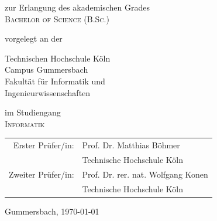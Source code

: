 \begin{titlepage}
\begin{center}
\vspace{1.2cm}

\begin{large}
zur Erlangung des akademischen Grades\\
\vspace{0.1cm}
\textsc{Bachelor of Science (B.Sc.)}\\ 
\end{large}

\vspace{0.6cm}

\begin{large}
vorgelegt an der\\ 
\vspace{0.2cm}
\begin{scshape}
Technischen Hochschule Köln\\
Campus Gummersbach\\
Fakultät für Informatik und\\
Ingenieurwissenschaften\\
\end{scshape}
\end{large}

\vspace{0.6cm}

\begin{large}
im Studiengang\\ 
\vspace{0.1cm}
\textsc{Informatik}
\end{large}


\vspace{1.2cm}

\begin{tabular}{rl}
        Erster Prüfer/in:  &  Prof. Dr. Matthias Böhmer\\
       					&  \small Technische Hochschule Köln \\[1.0em]
       Zweiter Prüfer/in:  &  Prof. Dr. rer. nat. Wolfgang Konen\\
       					&  \small Technische Hochschule Köln\\
\end{tabular}

\vspace{1.2cm}

\begin{large}
Gummersbach, \today
\end{large}


\end{center}
\end{titlepage}
